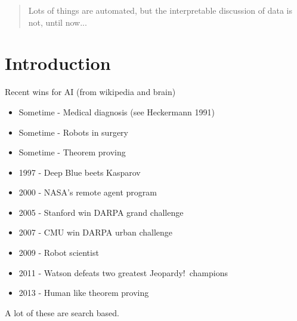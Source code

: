 \documentclass[twoside]{article}
\begin{document}


\begin{abstract}
Lots of things are automated, but the interpretable discussion of data is not, until now...
\end{abstract}

\section{Introduction}

Recent wins for AI (from wikipedia and brain)
\begin{itemize}
  \item Sometime - Medical diagnosis (see Heckermann 1991)
  \item Sometime - Robots in surgery
  \item Sometime - Theorem proving
  \item 1997 - Deep Blue beets Kasparov
  \item 2000 - NASA's remote agent program
  \item 2005 - Stanford win DARPA grand challenge
  \item 2007 - CMU win DARPA urban challenge
  \item 2009 - Robot scientist
  \item 2011 - Watson defeats two greatest Jeopardy!\ champions
  \item 2013 - Human like theorem proving
\end{itemize}
A lot of these are search based.
\end{document}
